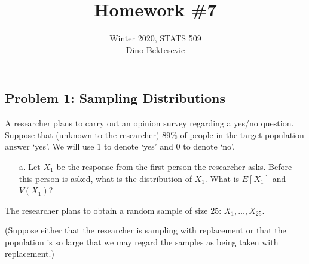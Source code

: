 \documentclass{article}
\date{{}}
\newcommand{\1}{\mathbf{1}}
\begin{document}
\title{Homework \#7}
\author{\normalsize{Winter 2020, STATS 509}\\
\normalsize{Dino Bektesevic}}
\maketitle

\subsection*{Problem 1: Sampling Distributions}
A researcher plans to carry out an opinion survey regarding a yes/no question. Suppose that (unknown to the researcher) $89\%$ of people in the target population answer `yes'. We will use $1$ to denote `yes' and $0$ to denote `no'.
\begin{itemize}
    \item[a.] Let $X_1$ be the response from the first person the researcher asks. Before this person is asked, what is the distribution of $X_1$. What is $E[X_1]$ and $V(X_1)$?
\end{itemize}
The researcher plans to obtain a random sample of size $25$: $X_1,\ldots , X_{25}$. \par
(Suppose either that the researcher is sampling with replacement or that the population is so large that we may regard the samples as being taken with replacement.)
\end{document}
